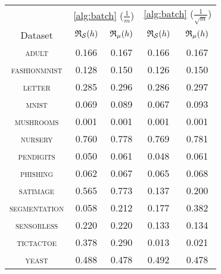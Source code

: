 \begin{tabular}{c|cc|cc}
\toprule
 & \multicolumn{2}{c}{\cref{alg:batch} {\small ($\frac{1}{m}$)}} & \multicolumn{2}{c}{\cref{alg:batch} {\small ($\frac{1}{\sqrt{m}}$)}} \\
Dataset & {\scriptsize $\mathfrak{R}_{\mathcal{S}}(h)$} & {\scriptsize $\mathfrak{R}_{\mu}(h)$} & {\scriptsize $\mathfrak{R}_{\mathcal{S}}(h)$} & {\scriptsize $\mathfrak{R}_{\mu}(h)$} \\
\midrule
\textsc{\footnotesize adult} & 0.166 & 0.167 & 0.166 & 0.167 \\
\textsc{\footnotesize fashionmnist} & 0.128 & 0.150 & 0.126 & 0.150 \\
\textsc{\footnotesize letter} & 0.285 & 0.296 & 0.286 & 0.297 \\
\textsc{\footnotesize mnist} & 0.069 & 0.089 & 0.067 & 0.093 \\
\textsc{\footnotesize mushrooms} & 0.001 & 0.001 & 0.001 & 0.001 \\
\textsc{\footnotesize nursery} & 0.760 & 0.778 & 0.769 & 0.781 \\
\textsc{\footnotesize pendigits} & 0.050 & 0.061 & 0.048 & 0.061 \\
\textsc{\footnotesize phishing} & 0.062 & 0.067 & 0.065 & 0.068 \\
\textsc{\footnotesize satimage} & 0.565 & 0.773 & 0.137 & 0.200 \\
\textsc{\footnotesize segmentation} & 0.058 & 0.212 & 0.177 & 0.382 \\
\textsc{\footnotesize sensorless} & 0.220 & 0.220 & 0.133 & 0.134 \\
\textsc{\footnotesize tictactoe} & 0.378 & 0.290 & 0.013 & 0.021 \\
\textsc{\footnotesize yeast} & 0.488 & 0.478 & 0.492 & 0.478 \\
\bottomrule
\end{tabular}
